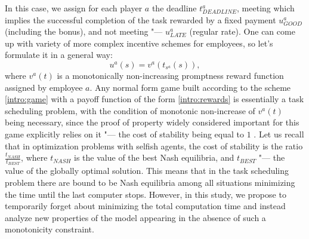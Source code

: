 In this case, we assign for each player $a$ the deadline $t^a_{DEADLINE}$, meeting which implies the successful completion of the task rewarded by a fixed payment $u^a_{GOOD}$ (including the bonus), and not meeting "--- $u^a_{LATE}$ (regular rate). One can come up with variety of more complex incentive schemes for employees, so let's formulate it in a general way: %
\begin{equation}\label{intro:rewards}
	u^a(s) = v^a(t_{s^a}(s)),
\end{equation}
where $v^a(t)$ is a monotonically non-increasing promptness reward function assigned by employee $a$. Any normal form game built according to the scheme \ref{intro:game} with a payoff function of the form \ref{intro:rewards} is essentially a task scheduling problem, with the condition of monotonic non-increase of $v^a(t)$ being necessary, since the proof of property widely considered important for this game explicitly relies on it "--- the cost of stability being equal to $1$ \cite {Agussurja}. Let us recall that in optimization problems with selfish agents, the cost of stability is the ratio $\frac{t_{NASH}}{t_{BEST}}$, where $t_{NASH}$ is the value of the best Nash equilibria, and $t_ {BEST}$ "--- the value of the globally optimal solution. This means that in the task scheduling problem there are bound to be Nash equilibria among all situations minimizing the time until the last computer stops. However, in this study, we propose to temporarily forget about minimizing the total computation time and instead analyze new properties of the model appearing in the absence of such a monotonicity constraint. %


